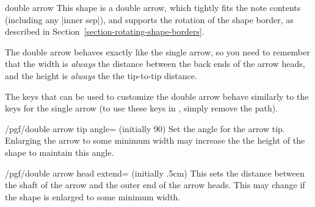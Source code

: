 \begin{shape}{double arrow}
  This shape is a double arrow, which tightly fits the note contents 
	(including any |inner sep|), and supports the rotation of the shape
	 border, as described in Section~\ref{section-rotating-shape-borders}. 
	 
	
\begin{codeexample}[]
\end{codeexample}

  The double arrow behaves exactly like the single arrow, so you
  need to remember that the width is \emph{always} the distance
  between the back ends of the arrow heads, and the height
  is \emph{always} the the tip-to-tip distance.
  
\begin{codeexample}[]
\end{codeexample}

  The \pgfname{} keys that can be used to customize the double arrow 
  behave similarly to the keys for the single arrow (to
	use these keys in \tikzname{}, simply remove the 
	path).
  
\begin{key}{/pgf/double arrow tip angle= (initially 90)}
  Set the angle for the arrow tip. Enlarging the arrow to some
  minimum width may increase the the height of the shape to maintain
  this angle.
\end{key}

\begin{key}{/pgf/double arrow head extend= (initially .5cm)}
  This sets the distance between the shaft of the arrow and the outer
  end of the arrow heads. This may change if the shape is enlarged to
  some minimum width.
\end{key}


\end{shape}
